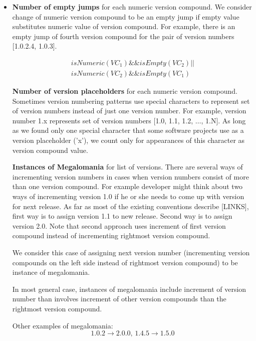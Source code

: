 \documentclass[conference]{IEEEtran}
\begin{document}
\begin{itemize}

\item \textbf{Number of empty jumps} for each numeric version compound. We consider change of numeric version compound to be an empty jump if empty value substitutes numeric value of version compound. For example, there is an empty jump of fourth version compound for the pair of version numbers [1.0.2.4, 1.0.3].


\begin{equation}
\begin{split}
isNumeric(VC_{1}) \&\& isEmpty(VC_{2})  || \\  
isNumeric(VC_{2}) \&\& isEmpty(VC_{1})
\end{split}
\end{equation}

 \textbf{Number of version placeholders} for each numeric version compound. Sometimes version numbering patterns use special characters to represent set of version numbers instead of just one version number. For example, version number 1.x represents set of version numbers [1.0, 1.1, 1.2, $\dots$, 1.N]. As long as we found only one special character that some software projects use as a version placeholder ('x'), we count only for appearances of this character as version compound value. 
 
 \textbf{Instances of Megalomania} for list of versions. 
There are several ways of incrementing version numbers in cases when version numbers consist of more than one version compound. For example developer might think about two ways of incrementing version 1.0 if he or she needs to come up with version for next release. As far as most of the existing conventions describe [LINKS], first way is to assign version 1.1 to new release. Second way is to assign version 2.0. Note that second approach uses increment of first version compound instead of incrementing rightmost version compound. 

We consider this case of assigning next version number (incrementing version compounds on the left side instead of rightmost version compound) to be instance of megalomania. 

In most general case, instances of megalomania include increment of version number than involves increment of other version compounds than the rightmost version compound.

Other examples of megalomania: $$ 1.0.2 \rightarrow 2.0.0 \texttt{, } 1.4.5 \rightarrow 1.5.0 $$


\end{itemize}
\end{document}
